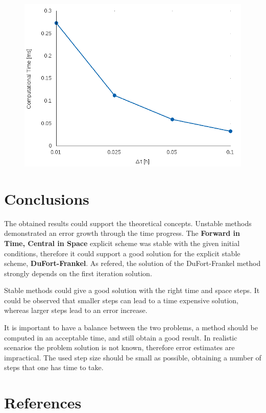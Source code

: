 \documentclass[12pt]{report}
\begin{document}
\begin{figure}[!htb]
  \centering
  \includegraphics[width=.6\linewidth]{laasonen_times.png}
\end{figure}

\pagebreak

\section*{Conclusions}

\par The obtained results could support the theoretical concepts. Unstable methods demonstrated an error growth through the time progress. The \textbf{Forward in Time, Central in Space} explicit scheme was stable with the given initial conditions, therefore it could support a good solution for the explicit stable scheme, \textbf{DuFort-Frankel}. As refered, the solution of the DuFort-Frankel method strongly depends on the first iteration solution.
\par Stable methods could give a good solution with the right time and space steps. It could be observed that smaller steps can lead to a time expensive solution, whereas larger steps lead to an error increase.
\par It is important to have a balance between the two problems, a method should be computed in an acceptable time, and still obtain a good result. In realistic scenarios the problem solution is not known, therefore error estimates are impractical. The used step size should be small as possible, obtaining a number of steps that one has time to take. 
 

\newpage
\section*{References}
\end{document}
